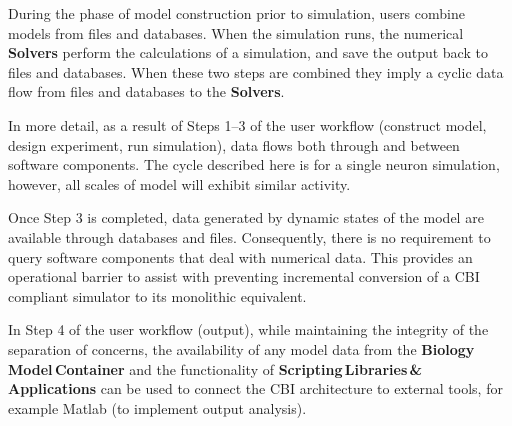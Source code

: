 \documentclass{article}
\begin{document}
During the phase of model construction prior to simulation, users
combine models from files and databases.  When the simulation runs,
the numerical {\bf Solvers} perform the calculations of a simulation,
and save the output back to files and databases.  When these two steps
are combined they imply a cyclic data flow from files and databases to
the {\bf Solvers}.

In more detail, as a result of Steps 1--3 of the user workflow (construct model, design experiment, run simulation), data flows both through and between software components. The cycle described here is for a single neuron simulation, however, all scales of model will exhibit similar activity.

Once Step 3 is completed, data generated by dynamic states of the model are available through databases and files. Consequently, there is no requirement to query software components that deal with numerical data. This provides an operational barrier to assist with preventing incremental conversion of a CBI compliant simulator to its monolithic equivalent.

In Step 4 of the user workflow (output), while maintaining the integrity of the separation of concerns, the availability of any model data from the {\bf Biology\,Model\,Container} and the functionality of {\bf Scripting\,Libraries\,\&\,Applications} can be used to connect the CBI architecture to external tools, for example Matlab (to implement output analysis).
\end{document}

